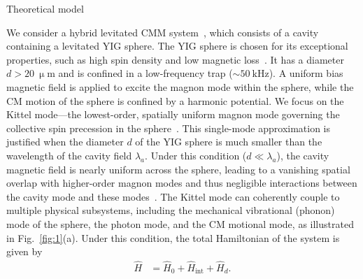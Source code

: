 \documentclass[aps, prresearch, reprint, nofootinbib, longbibliography]{revtex4-2}
\makeatletter
\renewcommand{\thesection}{\Alph{section}}%
\renewcommand{\section}{%
		\secdef{\@Appendix}{\@sAppendix}%
	}%
\newcommand{\@Appendix}[2][?]{%
		\refstepcounter{section}%
		\vspace{0.5em}
		{\centering\large\bfseries Appendix \thesection: #2\par}%
		\addcontentsline{toc}{section}{Appendix \thesection}%
		\markright{Appendix \thesection}%
	}%
\makeatother
\begin{document}
\section{Theoretical model} \label{II}

We consider a hybrid levitated CMM system~\cite{Nonreciprocity,PhysRevA.110.013710}, which consists of a cavity containing a levitated YIG sphere. The YIG sphere is chosen for its exceptional properties, such as high spin density and low magnetic loss~\cite{RevModPhys.85.623,Zhang:22,2016Cavity}. It has a diameter $d > 20~\mathrm{\upmu m}$ and is confined in a low-frequency trap ($\sim \SI{50}{\kilo\hertz}$).
A uniform bias magnetic field is applied to excite the magnon mode within the sphere, while the CM motion of the sphere is confined by a harmonic potential.
We focus on the Kittel mode---the lowest-order, spatially uniform magnon mode governing the collective spin precession in the sphere~\cite{2016Cavity}.
This single-mode approximation is justified when the diameter $d$ of the YIG sphere is much smaller than the wavelength of the cavity field $\lambda_a$. Under this condition ($d \ll \lambda_a$), the cavity magnetic field is nearly uniform across the sphere, leading to a vanishing spatial overlap with higher-order magnon modes and thus negligible interactions between the cavity mode and these modes~\cite{PhysRevLett.123.107702,PhysRevB.94.224410}.
The Kittel mode can coherently couple to multiple physical subsystems, including the mechanical vibrational (phonon) mode of the sphere, the photon mode, and the CM motional mode, as illustrated in Fig.~\ref{fig:1}(a).
Under this condition, the total Hamiltonian of the system is given by
\begin{align}
\hat{H} &= \hat{H}_0 + \hat{H}_{\text{int}} + \hat{H}_d. \label{eq:total_H}
\end{align}
\end{document}
